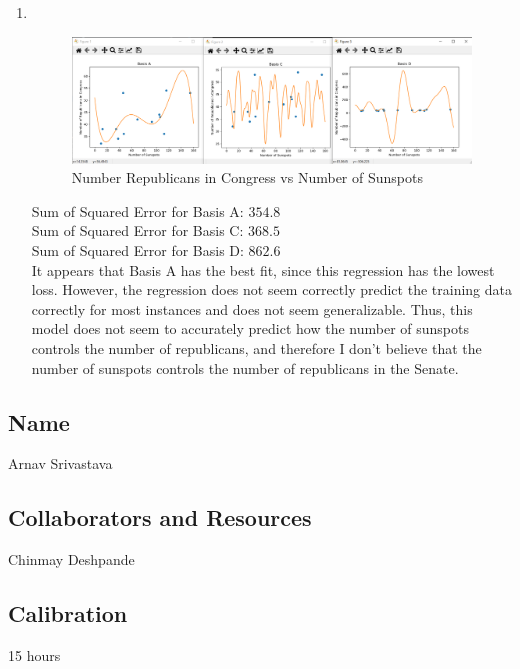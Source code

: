 \documentclass[submit]{harvardml}
\begin{document}
\begin{enumerate}
    
    \item 
    \\
    \begin{figure} [h!]
        \centering
        \includegraphics[width=\textwidth]{HW1/ps1-p4-repub-sunspots.png}
        \caption{Number Republicans in Congress vs Number of Sunspots}
    \end{figure}
    Sum of Squared Error for Basis A:  $354.8$ \\
    Sum of Squared Error for Basis C:  $368.5$ \\
    Sum of Squared Error for Basis D:  $862.6$ \\
    It appears that Basis A has the best fit, since this regression has the lowest loss. However, the regression does not seem correctly predict the training data correctly for most instances and does not seem generalizable. Thus, this model does not seem to accurately predict how the number of sunspots controls the number of republicans, and therefore I don't believe that the number of sunspots controls the number of republicans in the Senate.
\end{enumerate}


\newpage
\subsection*{Name}
Arnav Srivastava
\subsection*{Collaborators and Resources}
Chinmay Deshpande

\subsection*{Calibration}
15 hours
\end{document}
